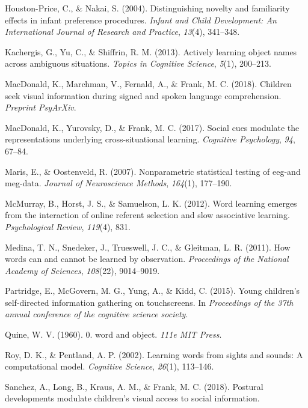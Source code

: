 \documentclass[man,floatsintext]{apa6}
\begin{document}
\hypertarget{ref-houston2004distinguishing}{}
Houston-Price, C., \& Nakai, S. (2004). Distinguishing novelty and
familiarity effects in infant preference procedures. \emph{Infant and
Child Development: An International Journal of Research and Practice},
\emph{13}(4), 341--348.

\hypertarget{ref-kachergis2013actively}{}
Kachergis, G., Yu, C., \& Shiffrin, R. M. (2013). Actively learning
object names across ambiguous situations. \emph{Topics in Cognitive
Science}, \emph{5}(1), 200--213.

\hypertarget{ref-macdonald2018speed}{}
MacDonald, K., Marchman, V., Fernald, A., \& Frank, M. C. (2018).
Children seek visual information during signed and spoken language
comprehension. \emph{Preprint PsyArXiv}.

\hypertarget{ref-macdonald2017social}{}
MacDonald, K., Yurovsky, D., \& Frank, M. C. (2017). Social cues
modulate the representations underlying cross-situational learning.
\emph{Cognitive Psychology}, \emph{94}, 67--84.

\hypertarget{ref-maris2007nonparametric}{}
Maris, E., \& Oostenveld, R. (2007). Nonparametric statistical testing
of eeg-and meg-data. \emph{Journal of Neuroscience Methods},
\emph{164}(1), 177--190.

\hypertarget{ref-mcmurray2012word}{}
McMurray, B., Horst, J. S., \& Samuelson, L. K. (2012). Word learning
emerges from the interaction of online referent selection and slow
associative learning. \emph{Psychological Review}, \emph{119}(4), 831.

\hypertarget{ref-medina2011words}{}
Medina, T. N., Snedeker, J., Trueswell, J. C., \& Gleitman, L. R.
(2011). How words can and cannot be learned by observation.
\emph{Proceedings of the National Academy of Sciences}, \emph{108}(22),
9014--9019.

\hypertarget{ref-partridge2015young}{}
Partridge, E., McGovern, M. G., Yung, A., \& Kidd, C. (2015). Young
children's self-directed information gathering on touchscreens. In
\emph{Proceedings of the 37th annual conference of the cognitive science
society}.

\hypertarget{ref-quine19600}{}
Quine, W. V. (1960). 0. word and object. \emph{111e MIT Press}.

\hypertarget{ref-roy2002learning}{}
Roy, D. K., \& Pentland, A. P. (2002). Learning words from sights and
sounds: A computational model. \emph{Cognitive Science}, \emph{26}(1),
113--146.

\hypertarget{ref-sanchez2018postural}{}
Sanchez, A., Long, B., Kraus, A. M., \& Frank, M. C. (2018). Postural
developments modulate children's visual access to social information.
\end{document}
